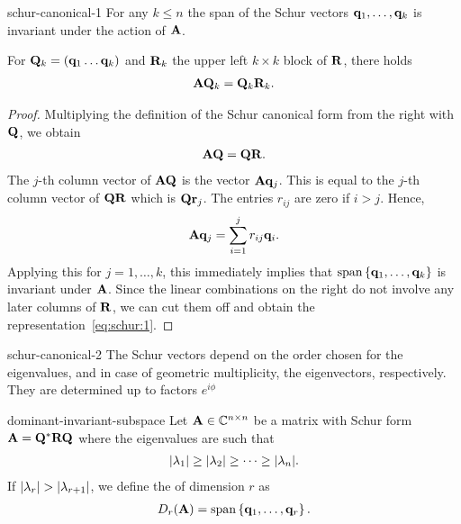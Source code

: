 \begin{Lemma}{schur-canonical-1}
  For any $k\le n$ the span of the Schur vectors
  $\mathbf q_1,\dots,\mathbf q_k$ is invariant under the action of $\mathbf A$.

  For $\mathbf Q_k = (\mathbf q_1\dots\mathbf q_k)$ and $\mathbf R_k$ the upper left $k\times k$ block of $\mathbf R$, there holds
  \begin{gather}
    \label{eq:schur:1}
    \mathbf A\mathbf Q_k = \mathbf Q_k \mathbf R_k.
  \end{gather}
\end{Lemma}

\begin{proof}
  Multiplying the definition of the Schur canonical form from the right with $\mathbf Q$, we obtain
  \begin{gather}
    \mathbf A\mathbf Q = \mathbf Q\mathbf R.
  \end{gather}
  The $j$-th column vector of $\mathbf A\mathbf Q$ is the vector
  $\mathbf A\mathbf q_j$. This is equal to the $j$-th column vector of
  $\mathbf Q\mathbf R$ which is $\mathbf Q\mathbf r_j$. The entries $r_{ij}$ are zero if
  $i>j$. Hence,
  \begin{gather}
    \mathbf A\mathbf q_j = \sum_{i=1}^j r_{ij}\mathbf q_i.
  \end{gather}
  Applying this for $j=1,\dots,k$, this immediately implies that
  $\operatorname{span}\left\{\mathbf q_1,\dots,\mathbf q_k\right\}$ is invariant under $\mathbf A$. Since the
  linear combinations on the right do not involve any later columns of
  $\mathbf R$, we can cut them off and obtain the representation~\eqref{eq:schur:1}.
\end{proof}

\begin{Lemma}{schur-canonical-2}
  The Schur vectors depend on the order chosen for the eigenvalues,
  and in case of geometric multiplicity, the eigenvectors,
  respectively. They are determined up to factors $e^{i\phi}$
\end{Lemma}

\begin{Definition}{dominant-invariant-subspace}
  Let $\mathbf A\in\mathbb C^{n\times n}$ be a matrix with Schur form
  $\mathbf A = \mathbf Q^*\mathbf R\mathbf Q$ where the eigenvalues are such that
  \begin{gather}
    \lvert\lambda_1\rvert\ge\lvert\lambda_2\rvert\ge\dots\ge\lvert\lambda_n\rvert.
  \end{gather}
  If $\lvert\lambda_r\rvert>\lvert\lambda_{r+1}\rvert$, we define the
   of dimension $r$ as
  \begin{gather}
    D_r(\mathbf A) = \operatorname{span}\left\{\mathbf q_1,\dots,\mathbf q_r\right\}.
  \end{gather}
\end{Definition}

